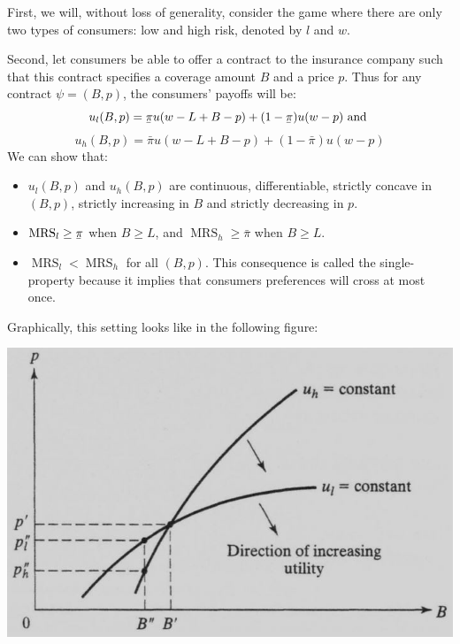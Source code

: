 \documentclass[12pt]{report}
\newcommand{\ubar}[1]{\underaccent{\bar}{#1}}
\begin{document}
First, we will, without loss of generality, consider the game where there are only two types of consumers: low and high risk, denoted by $l$ and $w$.

Second, let consumers be able to offer a contract to the insurance company such that this contract specifies a coverage amount $B$ and a price $p$. Thus for any contract $\psi = (B, p)$, the consumers' payoffs will be: $$u_l(B,p) = \ubar\pi u(w - L + B - p) + (1 - \ubar\pi) u(w - p) \text{ and }$$ $$u_h(B,p) = \bar\pi u(w - L + B - p) + (1 - \bar\pi) u(w - p) $$ We can show that:\begin{itemize}
\item $u_l(B,p)$ and $u_h(B,p)$ are continuous, differentiable, strictly concave in $(B, p)$, strictly increasing in $B$ and strictly decreasing in $p$.
\item $\operatorname{MRS}_l \geq \ubar\pi$ when $B\geq L$, and $\operatorname{MRS}_h \geq \bar\pi$ when $B\geq L$.
\item $\operatorname{MRS}_l < \operatorname{MRS}_h$ for all $(B,p)$. This consequence is called the single-property because it implies that consumers preferences will cross at most once.
\end{itemize} Graphically, this setting looks like in the following figure:\begin{center}
\includegraphics[scale=0.5]{images/advselecutil}
\end{center}
\end{document}
